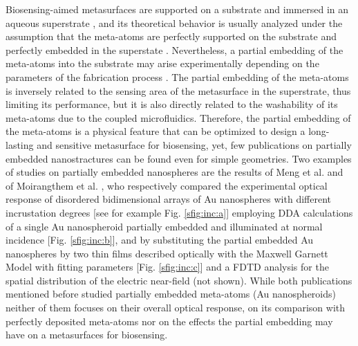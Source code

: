 Biosensing-aimed metasurfaces are supported on a substrate and immersed in an aqueous superstrate \cite{estevez_trends_2014}, and its theoretical behavior is usually analyzed under the assumption that the meta-atoms are perfectly supported on the substrate and perfectly embedded in the superstate  \cite{kabashin_plasmonic_2009,qiu_differential_2015,barrera1991optical,svedendahl_refractometric_2014,bedeaux_optical_2004}. Nevertheless, a partial embedding of the meta-atoms into the substrate may arise experimentally depending on the parameters of the fabrication process  \cite{meng_anisotropic_2015,moirangthem_enhanced_2012}. The partial embedding of the meta-atoms is inversely related to the sensing area of the metasurface in the superstrate, thus limiting its performance, but it is also directly related to the washability of its meta-atoms due to the coupled microfluidics. Therefore, the partial embedding of the meta-atoms is a physical feature that can be optimized to design a long-lasting and sensitive metasurface for biosensing, yet, few publications on partially embedded nanostractures can be found even for simple geometries. Two examples of studies on partially embedded nanospheres are the results of Meng et al. \cite{meng_anisotropic_2015} and of Moirangthem et al. \cite{moirangthem_enhanced_2012}, who respectively compared the experimental optical response of disordered bidimensional arrays of Au nanospheres with different incrustation degrees [see for example Fig. \ref{sfig:inc:a}] employing DDA calculations of a single Au nanospheroid partially embedded and illuminated at normal incidence [Fig. \ref{sfig:inc:b}], and by substituting the partial embedded Au nanospheres by two thin films described optically with the Maxwell Garnett Model with fitting parameters [Fig. \ref{sfig:inc:c}] and a FDTD analysis for the spatial distribution of the electric near-field (not shown). While both publications mentioned before studied partially embedded meta-atoms (Au nanospheroids) neither of them focuses on their overall optical response,  on its comparison with perfectly deposited meta-atoms nor on the effects the partial embedding may have on a metasurfaces for biosensing.

